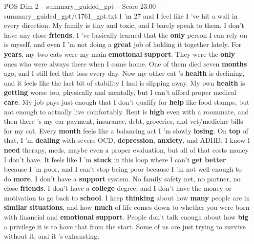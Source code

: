 \begin{textsample}{POS Dim 2 – summary\_guided\_gpt – Score 23.00 – summary\_guided\_gpt/t1761\_gpt.txt}  \label{ex:f2_pos_010}
I ’m 27 and I feel like I ’ve hit a wall in every direction.
My family is tiny and toxic, and I barely speak to them.
I don't have any close \textbf{friends}.
I ’ve basically learned that the \textbf{only} person I can rely on is myself, and even I ’m not doing a \textbf{great} job of holding it together lately.
For \textbf{years}, my two cats were my main \textbf{emotional} \textbf{support}.
They were the \textbf{only} ones who were always there when I came home.
One of them died seven \textbf{months} ago, and I still feel that loss every day.
Now my other cat ’s \textbf{health} is declining, and it feels like the last bit of stability I had is slipping away.
My own \textbf{health} is \textbf{getting} worse too, physically and mentally, but I can't afford proper medical \textbf{care}.
My job pays just enough that I don't qualify for \textbf{help} like food stamps, but not enough to actually live comfortably.
Rent is \textbf{high} even with a roommate, and then there ’s my car payment, insurance, debt, groceries, and vet/medicine bills for my cat.
Every \textbf{month} feels like a balancing act I ’m slowly \textbf{losing}.
On \textbf{top} of that, I ’m \textbf{dealing} with severe OCD, \textbf{depression}, \textbf{anxiety}, and ADHD.
I know I \textbf{need} therapy, meds, maybe even a proper evaluation, but all of that costs money I don't have.
It feels like I ’m \textbf{stuck} in this loop where I can't \textbf{get} \textbf{better} because I ’m poor, and I can't stop being poor because I ’m not well enough to do \textbf{more}.
I don't have a \textbf{support} system.
No family safety net, no partner, no close \textbf{friends}.
I don't have a \textbf{college} degree, and I don't have the money or motivation to go back to \textbf{school}.
I keep \textbf{thinking} about how \textbf{many} people are in \textbf{similar} \textbf{situations}, and how \textbf{much} of life comes down to whether you were born with financial and \textbf{emotional} \textbf{support}.
People don't talk enough about how \textbf{big} a privilege it is to have that from the start.
Some of us are just trying to survive without it, and it ’s exhausting.

\end{textsample}
